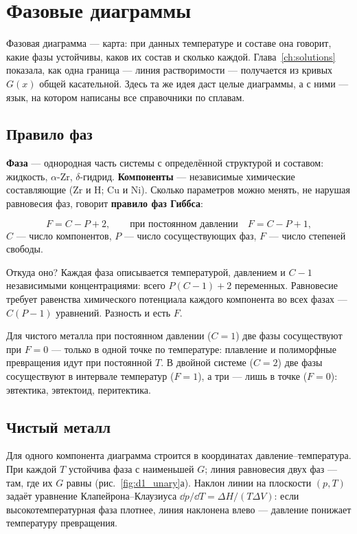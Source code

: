 \chapter{Фазовые диаграммы}\label{ch:diagrams}

Фазовая диаграмма --- карта: при данных температуре и составе она говорит, какие фазы устойчивы, каков их состав и
сколько каждой. Глава~\ref{ch:solutions} показала, как одна граница --- линия растворимости --- получается из кривых
$G(x)$ общей касательной. Здесь та же идея даст целые диаграммы, а с ними --- язык, на котором написаны все
справочники по сплавам.

\section{Правило фаз}

\textbf{Фаза} --- однородная часть системы с определённой структурой и составом: жидкость, $\alpha$-Zr, $\delta$-гидрид.
\textbf{Компоненты} --- независимые химические составляющие (Zr и H; Cu и Ni). Сколько параметров можно менять,
не нарушая равновесия фаз, говорит \textbf{правило фаз Гиббса}:
\begin{keyf}
\[
F = C - P + 2,\qquad \text{при постоянном давлении}\quad F = C - P + 1,
\]
$C$ --- число компонентов, $P$ --- число сосуществующих фаз, $F$ --- число степеней свободы.
\end{keyf}
Откуда оно? Каждая фаза описывается температурой, давлением и $C - 1$ независимыми концентрациями: всего
$P(C-1) + 2$ переменных. Равновесие требует равенства химического потенциала каждого компонента во всех фазах ---
$C(P-1)$ уравнений. Разность и есть $F$.

Для чистого металла при постоянном давлении ($C = 1$) две фазы сосуществуют при $F = 0$ --- только в одной точке по
температуре: плавление и полиморфные превращения идут при постоянной $T$. В двойной системе ($C = 2$) две фазы
сосуществуют в интервале температур ($F = 1$), а три --- лишь в точке ($F = 0$): эвтектика, эвтектоид, перитектика.

\section{Чистый металл}

Для одного компонента диаграмма строится в координатах давление--температура. При каждой $T$ устойчива фаза с
наименьшей $G$; линия равновесия двух фаз --- там, где их $G$ равны (рис.~\ref{fig:d1_unary}а). Наклон линии на
плоскости $(p,T)$ задаёт уравнение Клапейрона--Клаузиуса $\dd p/\dd T = \Delta H/(T\Delta V)$: если высокотемпературная
фаза плотнее, линия наклонена влево --- давление понижает температуру превращения.

